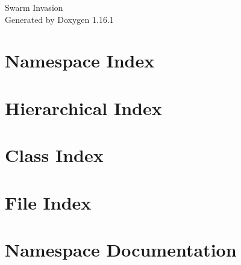 \documentclass[twoside]{book}
\newcommand{\+}{\discretionary{\mbox{\scriptsize$\hookleftarrow$}}{}{}}
\newcommand{\clearemptydoublepage}{%
    \newpage{\pagestyle{empty}\cleardoublepage}%
  }
\begin{document}
  \raggedbottom
    \hypersetup{pageanchor=false,
                bookmarksnumbered=true,
                pdfencoding=unicode
               }
  \begin{titlepage}
  \vspace*{7cm}
  \begin{center}%
  {\Large Swarm Invasion}\\
  \vspace*{1cm}
  {\large Generated by Doxygen 1.16.1}\\
  \end{center}
  \end{titlepage}
  \clearemptydoublepage
  \tableofcontents
  \clearemptydoublepage
  \hypersetup{pageanchor=true}

\chapter{Namespace Index}

\chapter{Hierarchical Index}

\chapter{Class Index}

\chapter{File Index}

\chapter{Namespace Documentation}


\end{document}
